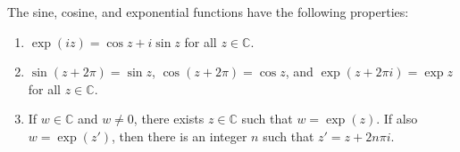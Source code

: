 The sine, cosine, and exponential functions have the following properties:

\begin{enumerate}
\item[(a)] $\exp(iz) = \cos z + i \sin z$ for all $z \in \mathbb{C}$.
\item[(b)] $\sin(z + 2\pi) = \sin z$, $\cos(z + 2\pi) = \cos z$, and $\exp(z + 2\pi i) = \exp z$ for all $z \in \mathbb{C}$.
\item[(c)] If $w \in \mathbb{C}$ and $w \neq 0$, there exists $z \in \mathbb{C}$ such that $w = \exp(z)$. If also $w = \exp(z')$, then there is an integer $n$ such that $z' = z + 2n\pi i$.
\end{enumerate}
